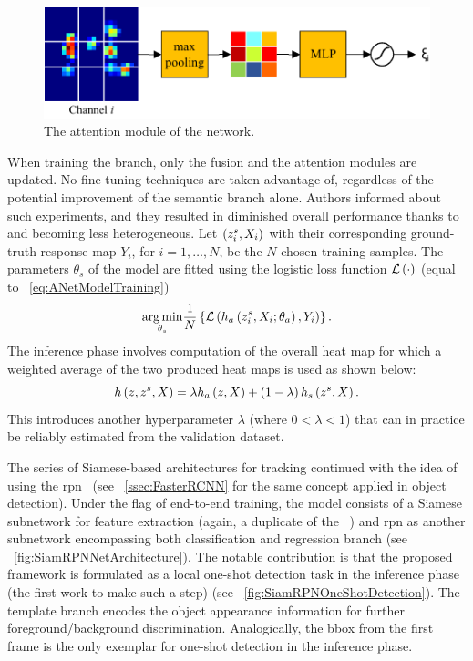\begin{figure}[t]
    \centerline{\includegraphics[width=0.6\linewidth]{figures/theoretical_foundations/twofold_siamese_net_attention_module.pdf}}
    \caption[\snet{} attention module]{The attention module of the \snet{} network. }
    \label{fig:TwofoldSiameseNetAttentionModule}
\end{figure}

When training the \snet{} branch, only the fusion and the attention modules are updated. No fine-tuning techniques are taken advantage of, regardless of the potential improvement of the semantic branch alone. Authors informed about such experiments, and they resulted in diminished overall performance thanks to \anet{} and \snet{} becoming less heterogeneous. Let $\left( {{z}_{i}^{s}, X_i} \right)$ with their corresponding ground-truth response map $Y_i$, for $i = 1, \dots, N$, be the $N$ chosen training samples. The parameters $\theta_s$ of the \snet{} model are fitted using the logistic loss function ${\mathcal{L}} \left( \cdot \right)$ (equal to \eqstr{}~\ref{eq:ANetModelTraining})
\begin{equation}
    \label{eq:SNetModelTraining}
    \underset{\theta_s}{\operatorname*{arg\,min}}
    \frac{1}{N}
    \left\{ {
        {\mathcal{L}} \left( 
            {h_a} \left( {z}_{i}^{s}, X_i; \theta_a \right),
            Y_i
         \right)
    } \right\}.
\end{equation}
The inference phase involves computation of the overall heat map for which a weighted average of the two produced heat maps is used as shown below:
\begin{equation}
    {h} \left( z, z^s, X \right) = \lambda {h_a} \left( z, X \right) + \left( {1 - \lambda} \right) {h_s} \left( z^s, X \right).
\end{equation}
This introduces another hyperparameter $\lambda$ (where $0 < \lambda < 1$) that can in practice be reliably estimated from the validation dataset.

The series of Siamese-based architectures for tracking continued with the idea of using the \gls{rpn}~\cite{li2018siamrpn} (see \sectionstr{}~\ref{ssec:FasterRCNN} for the same concept applied in object detection). Under the flag of end-to-end training, the \siamrpn{} model consists of a Siamese subnetwork for feature extraction (again, a duplicate of the \siamfc{}~\cite{bertinetto2016siamfc}) and \gls{rpn} as another subnetwork encompassing both classification and regression branch (see \figstr{}~\ref{fig:SiamRPNNetArchitecture}). The notable contribution is that the proposed framework is formulated as a local one-shot detection task in the inference phase (the first work to make such a step) (see \figstr{}~\ref{fig:SiamRPNOneShotDetection}). The template branch encodes the object appearance information for further foreground/background discrimination. Analogically, the \gls{bbox} from the first frame is the only exemplar for one-shot detection in the inference phase.

